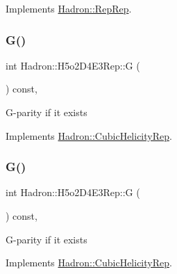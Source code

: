 Implements \mbox{\hyperlink{structHadron_1_1RepRep_a92c8802e5ed7afd7da43ccfd5b7cd92b}{Hadron\+::\+Rep\+Rep}}.

\mbox{\label{structHadron_1_1H5o2D4E3Rep_a78e14d8a4ac2e04a138cceb78c763e3e}} 
\subsubsection{\texorpdfstring{G()}{G()}\hspace{0.1cm}{\footnotesize\ttfamily [1/3]}}
{\footnotesize\ttfamily int Hadron\+::\+H5o2\+D4\+E3\+Rep\+::G (\begin{DoxyParamCaption}{ }\end{DoxyParamCaption}) const\hspace{0.3cm}{\ttfamily [inline]}, {\ttfamily [virtual]}}

G-\/parity if it exists 

Implements \mbox{\hyperlink{structHadron_1_1CubicHelicityRep_a50689f42be1e6170aa8cf6ad0597018b}{Hadron\+::\+Cubic\+Helicity\+Rep}}.

\mbox{\label{structHadron_1_1H5o2D4E3Rep_a78e14d8a4ac2e04a138cceb78c763e3e}} 
\subsubsection{\texorpdfstring{G()}{G()}\hspace{0.1cm}{\footnotesize\ttfamily [2/3]}}
{\footnotesize\ttfamily int Hadron\+::\+H5o2\+D4\+E3\+Rep\+::G (\begin{DoxyParamCaption}{ }\end{DoxyParamCaption}) const\hspace{0.3cm}{\ttfamily [inline]}, {\ttfamily [virtual]}}

G-\/parity if it exists 

Implements \mbox{\hyperlink{structHadron_1_1CubicHelicityRep_a50689f42be1e6170aa8cf6ad0597018b}{Hadron\+::\+Cubic\+Helicity\+Rep}}.

\mbox{\label{structHadron_1_1H5o2D4E3Rep_a78e14d8a4ac2e04a138cceb78c763e3e}} 

